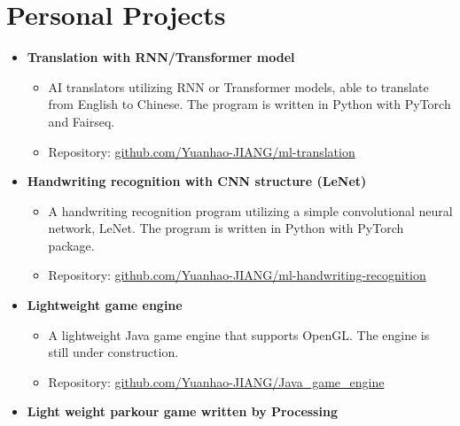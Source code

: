 \documentclass[12pt, a4paper]{article}
\newcommand{\resumeSection}[1]{
    \section*{#1}
}
\newcommand{\resumeSectionSubItmII}[1]{\item \textbf{#1}}
\begin{document}
\resumeSection{Personal Projects}
\vspace{1mm}
\begin{itemize}[leftmargin=*]
    \resumeSectionSubItmII{Translation with RNN/Transformer model}
    \vspace{-3mm}
    \begin{itemize}[leftmargin=*]
        \setlength\itemsep{-0.3mm}
        \item AI translators utilizing RNN or Transformer
            models, able to translate from English to Chinese. The program is
            written in Python with PyTorch and Fairseq.
        \item Repository: \href{https://github.com/Yuanhao-JIANG/ml-translation}
            {github.com/Yuanhao-JIANG/ml-translation}
    \end{itemize}\vspace{-3.5mm}
    \resumeSectionSubItmII{Handwriting recognition with CNN structure (LeNet)}
    \vspace{-3mm}
    \begin{itemize}[leftmargin=*]
        \setlength\itemsep{-0.3mm}
        \item A handwriting recognition program utilizing a simple convolutional
            neural network, LeNet. The program is written in Python with
            PyTorch package.
        \item Repository:
            \href{https://github.com/Yuanhao-JIANG/ml-handwriting-recognition}
            {github.com/Yuanhao-JIANG/ml-handwriting-recognition}
    \end{itemize}\vspace{-3.5mm}
    \resumeSectionSubItmII{Lightweight game engine}
    \vspace{-3mm}
    \begin{itemize}[leftmargin=*]
        \setlength\itemsep{-0.3mm}
        \item A lightweight Java game engine that supports OpenGL. The engine is still under construction.
        \item Repository:
            \href{https://github.com/Yuanhao-JIANG/Java\_game\_engine}
            {github.com/Yuanhao-JIANG/Java\_game\_engine}
    \end{itemize}\vspace{-3.5mm}
    \resumeSectionSubItmII{Light weight parkour game written by Processing}
    \vspace{-3mm}
    \begin{itemize}[leftmargin=*]

\end{itemize}
\end{itemize}
\end{document}
